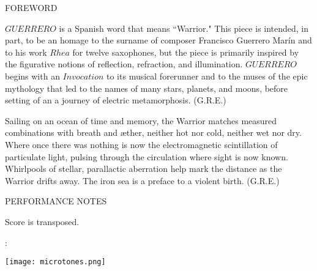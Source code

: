 \documentclass[10pt]{article}
\begin{document}
\begin{center}
\huge FOREWORD
\end{center}

\begingroup
\begin{center}
\hspace{10mm} $GUERRERO$ is a Spanish word that means ``Warrior." This piece is intended, in part, to be an homage to the surname of composer Francisco Guerrero Mar\'in and to his work $Rhea$ for twelve saxophones, but the piece is primarily inspired by the figurative notions of reflection, refraction, and illumination. $GUERRERO$ begins with an $Invocation$ to its musical forerunner and to the muses of the epic mythology that led to the names of many stars, planets, and moons, before setting of an a journey of electric metamorphosis.
\rightskip\leftskip
\phantom{text} \hfill (G.R.E.)
\end{center}
\endgroup

\vspace*{7\baselineskip}

\begingroup
\begin{center}
\hspace{10mm} Sailing on an ocean of time and memory, the Warrior matches measured combinations with breath and \ae ther, neither hot nor cold, neither wet nor dry. Where once there was nothing is now the electromagnetic scintillation of particulate light, pulsing through the circulation where sight is now known. Whirlpools of stellar, parallactic aberration help mark the distance as the Warrior drifts away. The iron sea is a preface to a violent birth.
\rightskip\leftskip
\phantom{text} \hfill (G.R.E.)
\end{center}
\endgroup  
  
\vspace*{7\baselineskip}

\begin{center}
\huge PERFORMANCE NOTES
\end{center}

\begin{center}
Score is transposed.
\end{center}

\begin{center}
:
\end{center}

\begin{center}
\texttt{[image: microtones.png]}
\end{center}
\end{document}
